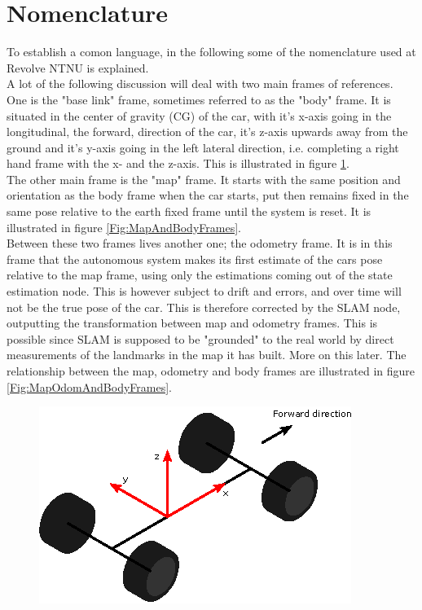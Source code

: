 \section{Nomenclature}

To establish a comon language, in the following some of the nomenclature used at Revolve NTNU is explained. \\

A lot of the following discussion will deal with two main frames of references. One is the "base link" frame, sometimes referred to as the "body" frame. It is situated in the center of gravity (CG) of the car, with it's x-axis going in the longitudinal, the forward, direction of the car, it's z-axis upwards away from the ground and it's y-axis going in the left lateral direction, i.e. completing a right hand frame with the x- and the z-axis. This is illustrated in figure \ref{Fig:BodyFrame}. \\ 

The other main frame is the "map" frame. It starts with the same position and orientation as the body frame when the car starts, put then remains fixed in the same pose relative to the earth fixed frame until the system is reset. It is illustrated in figure \ref{Fig:MapAndBodyFrames}. \\

Between these two frames lives another one; the odometry frame. It is in this frame that the autonomous system makes its first estimate of the cars pose relative to the map frame, using only the estimations coming out of the state estimation node. This is however subject to drift and errors, and over time will not be the true pose of the car. This is therefore corrected by the SLAM node, outputting the transformation between map and odometry frames. This is possible since SLAM is supposed to be "grounded" to the real world by direct measurements of the landmarks in the map it has built. More on this later. The relationship between the map, odometry and body frames are illustrated in figure \ref{Fig:MapOdomAndBodyFrames}. \\ 

\begin{figure}
    \centering
    \includegraphics[width=0.5\linewidth]{0_Images/2_Introduction/BaseLinkFrame.eps}
    \label{Fig:BodyFrame}
\end{figure}

